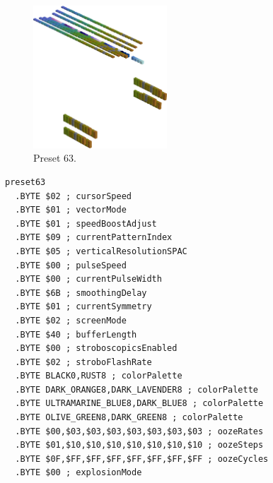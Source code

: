 \begin{minipage}[b]{0.48\linewidth}
\begin{figure}[H]                                                          
  \centering                                                             
  \begin{adjustbox}{width=5cm,center}                                   
  \includegraphics[width=5cm]{src/colorspace_presets/preset63-45.png}%
  \end{adjustbox}                                                        
\caption*{Preset 63.}                                           
\end{figure}                                                               
\end{minipage}
\hspace{0.1cm}
\begin{minipage}[b]{0.48\linewidth}                            
\begin{lstlisting}[basicstyle=\ttfamily\tiny]
preset63
  .BYTE $02 ; cursorSpeed
  .BYTE $01 ; vectorMode
  .BYTE $01 ; speedBoostAdjust
  .BYTE $09 ; currentPatternIndex
  .BYTE $05 ; verticalResolutionSPAC
  .BYTE $00 ; pulseSpeed
  .BYTE $00 ; currentPulseWidth
  .BYTE $6B ; smoothingDelay
  .BYTE $01 ; currentSymmetry
  .BYTE $02 ; screenMode
  .BYTE $40 ; bufferLength
  .BYTE $00 ; stroboscopicsEnabled
  .BYTE $02 ; stroboFlashRate
  .BYTE BLACK0,RUST8 ; colorPalette
  .BYTE DARK_ORANGE8,DARK_LAVENDER8 ; colorPalette
  .BYTE ULTRAMARINE_BLUE8,DARK_BLUE8 ; colorPalette
  .BYTE OLIVE_GREEN8,DARK_GREEN8 ; colorPalette
  .BYTE $00,$03,$03,$03,$03,$03,$03,$03 ; oozeRates
  .BYTE $01,$10,$10,$10,$10,$10,$10,$10 ; oozeSteps
  .BYTE $0F,$FF,$FF,$FF,$FF,$FF,$FF,$FF ; oozeCycles
  .BYTE $00 ; explosionMode
\end{lstlisting}
\end{minipage}

\vspace*{-0.5cm}

